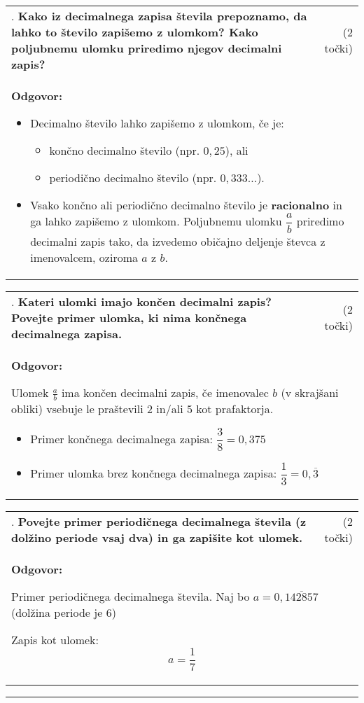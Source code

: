 \documentclass[12pt]{article}
\newcounter{vprasanje}[section]
\renewcommand{\thevprasanje}{\roman{vprasanje}}
\newcommand{\vprasanje}[2]{%
  \stepcounter{vprasanje}%
  \textbf{\thevprasanje}. \textbf{#1} & (#2) \\
}
\newcommand{\odgovor}[1]{%
  \multicolumn{2}{p{\dimexpr\textwidth-2\tabcolsep\relax}}{%
    \small \textbf{Odgovor:} #1%
  } \\[1em]%
}
\newcommand{\crta}{\rule{\textwidth}{0.4pt}}
\newcommand{\razmak}[1]{%
  \vspace{#1}
}
\begin{document}
\begin{tabularx}{\textwidth}{X r}
\vprasanje{Kako iz decimalnega zapisa števila prepoznamo, da lahko to število zapišemo z ulomkom? Kako poljubnemu ulomku priredimo njegov decimalni zapis?}{2 točki}
\odgovor{%
\begin{itemize}
	\item Decimalno število lahko zapišemo z ulomkom, če je:
	\begin{itemize}
  		\item končno decimalno število (npr. $0{,}25$), ali
  		\item periodično decimalno število (npr. $0{,}333\ldots$).
	\end{itemize}
	\item Vsako končno ali periodično decimalno število je \textbf{racionalno} in ga lahko zapišemo z ulomkom. Poljubnemu ulomku $\dfrac{a}{b}$ priredimo decimalni zapis tako, da izvedemo običajno deljenje števca z imenovalcem, oziroma $a$ z $b$.
\end{itemize}
}
\end{tabularx}

\begin{tabularx}{\textwidth}{X r}
\vprasanje{Kateri ulomki imajo končen decimalni zapis? Povejte primer ulomka, ki nima končnega decimalnega zapisa.}{2 točki}
\odgovor{%

Ulomek $\frac{a}{b}$ ima končen decimalni zapis, če imenovalec $b$ (v skrajšani obliki) vsebuje le praštevili $2$ in/ali $5$ kot prafaktorja.
\begin{itemize}
	\item Primer končnega decimalnega zapisa: $\dfrac{3}{8} = 0{,}375$
	\item Primer ulomka brez končnega decimalnega zapisa: $\dfrac{1}{3} = 0{,}\overline{3}$
\end{itemize}
}
\end{tabularx}

\begin{tabularx}{\textwidth}{X r}
\vprasanje{Povejte primer periodičnega decimalnega števila (z dolžino periode vsaj dva) in ga zapišite kot ulomek.}{2 točki}
\odgovor{%

Primer periodičnega decimalnega števila. Naj bo $a = 0{,}\overline{142857}$ (dolžina periode je $6$)

Zapis kot ulomek:
\[
a = \dfrac{1}{7}
\]
}
\end{tabularx}

\razmak{0.5em}

\crta
\end{document}
